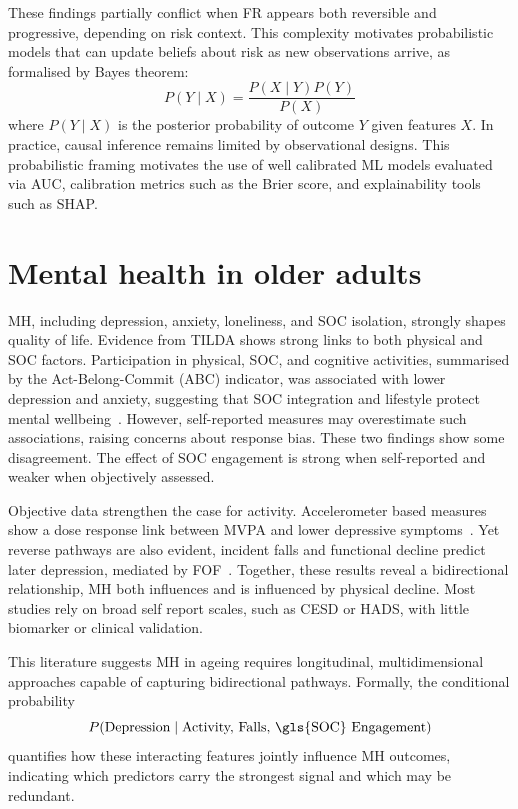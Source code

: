 These findings partially conflict when \gls{FR} appears both reversible and progressive, depending on risk context. This complexity motivates probabilistic models that can update beliefs about risk as new observations arrive, as formalised by Bayes theorem:
\begin{equation*}
P(Y \mid X) = \frac{P(X \mid Y) P(Y)}{P(X)}
\end{equation*}
where $P(Y \mid X)$ is the posterior probability of outcome $Y$ given features $X$. In practice, causal inference remains limited by observational designs. This probabilistic framing motivates the use of well calibrated \gls{ML} models evaluated via \gls{AUC}, calibration metrics such as the Brier score, and explainability tools such as \gls{SHAP}.

\section{Mental health in older adults}\label{sc:mental_health}
\gls{MH}, including depression, anxiety, loneliness, and \gls{SOC} isolation, strongly shapes quality of life. 
Evidence from \gls{TILDA} shows strong links to both physical and \gls{SOC} factors. Participation in physical, \gls{SOC}, and cognitive activities, summarised by the Act-Belong-Commit (ABC) indicator, was associated with lower depression and anxiety, suggesting that \gls{SOC} integration and lifestyle protect mental wellbeing~\cite{santiniProtectivePropertiesActBelongCommit2017}. However, self-reported measures may overestimate such associations, raising concerns about response bias.
These two findings show some disagreement. The effect of \gls{SOC} engagement is strong when self-reported and weaker when objectively assessed.

Objective data strengthen the case for activity. Accelerometer based measures show a dose response link between \gls{MVPA} and lower depressive symptoms~\cite{lairdPhysicalActivityDose2023}. 
Yet reverse pathways are also evident, incident falls and functional decline predict later depression, mediated by \gls{FOF}~\cite{jacobFallsIncreaseRisk2023}. 
Together, these results reveal a bidirectional relationship, \gls{MH} both influences and is influenced by physical decline. Most studies rely on broad self report scales, such as \gls{CESD} or \gls{HADS}, with little biomarker or clinical validation. 

This literature suggests \gls{MH} in ageing requires longitudinal, multidimensional approaches capable of capturing bidirectional pathways.
Formally, the conditional probability
\begin{equation*}
P(\text{Depression} \mid \text{Activity, Falls, \gls{SOC} Engagement})
\end{equation*}
quantifies how these interacting features jointly influence \gls{MH} outcomes, indicating which predictors carry the strongest signal and which may be redundant.

